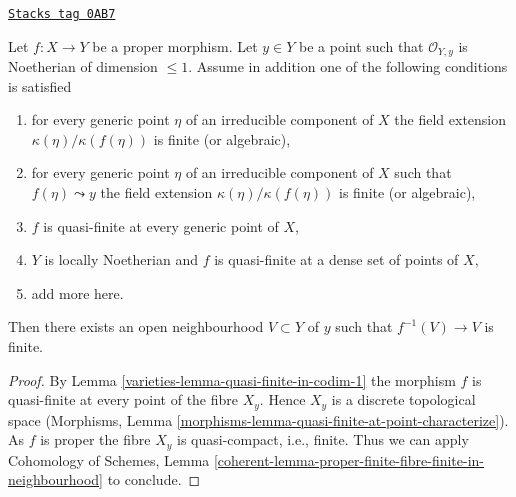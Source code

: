 \begin{lemma}
\label{varieties-lemma-finite-in-codim-1}
\href{https://stacks.math.columbia.edu/tag/0AB7}{\texttt{Stacks tag 0AB7}}

Let $f : X \to Y$ be a proper morphism. Let $y \in Y$ be a point
such that $\mathcal{O}_{Y, y}$ is Noetherian of dimension $\leq 1$.
Assume in addition one of the following conditions is satisfied
\begin{enumerate}
\item for every generic point $\eta$ of an irreducible component
of $X$ the field extension $\kappa(\eta)/\kappa(f(\eta))$
is finite (or algebraic),
\item for every generic point $\eta$ of an irreducible component
of $X$ such that $f(\eta) \leadsto y$ the field extension
$\kappa(\eta)/\kappa(f(\eta))$ is finite (or algebraic),
\item $f$ is quasi-finite at every generic point of $X$,
\item $Y$ is locally Noetherian and $f$
is quasi-finite at a dense set of points of $X$,
\item add more here.
\end{enumerate}
Then there exists an open neighbourhood $V \subset Y$ of $y$ such that
$f^{-1}(V) \to V$ is finite.
\end{lemma}

\begin{proof}

By Lemma \ref{varieties-lemma-quasi-finite-in-codim-1} the morphism $f$ is
quasi-finite at every point of the fibre $X_y$. Hence
$X_y$ is a discrete topological space
(Morphisms, Lemma \ref{morphisms-lemma-quasi-finite-at-point-characterize}).
As $f$ is proper the fibre $X_y$ is quasi-compact, i.e., finite.
Thus we can apply Cohomology of Schemes, Lemma
\ref{coherent-lemma-proper-finite-fibre-finite-in-neighbourhood}
to conclude.
\end{proof}

